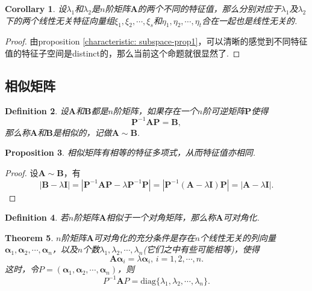 \documentclass{article}
\newtheorem{theorem}{Theorem}[section]
\newtheorem{corollary}[theorem]{Corollary}
\newtheorem{proposition}[theorem]{Proposition}
\newtheorem{definition}[theorem]{Definition}
\newcommand{\mbf}[1]{\bm{#1}}
\begin{document}
\begin{corollary}\label{characteristic: subspace-prop2}
\rm 设$\lambda_1$和$\lambda_2$是$n$阶矩阵$\mbf{A}$的两个不同的特征值，那么分别对应于$\lambda_1$及$\lambda_2$下的两个线性无关特征向量组$\xi_1,\xi_2,\cdots,\xi_s$和$\eta_1,\eta_2,\cdots,\eta_t$合在一起也是线性无关的.
\end{corollary}

\begin{proof}
由proposition \ref{characteristic: subspace-prop1}，可以清晰的感觉到不同特征值的特征子空间是distinct的，那么当前这个命题就很显然了. 
\end{proof}

\newpage
\subsection{相似矩阵}

\begin{definition}
\rm 设$\mbf{A}$和$\mbf{B}$都是$n$阶矩阵，如果存在一个$n$阶可逆矩阵$\mbf{P}$使得
$$
\mbf{P}^{-1}\mbf{A}\mbf{P} = \mbf{B},
$$
那么称$\mbf{A}$和$\mbf{B}$是相似的，记做$\mbf{A} \sim \mbf{B}$.
\end{definition}

\begin{proposition}
\rm 相似矩阵有相等的特征多项式，从而特征值亦相同. 
\end{proposition}

\begin{proof}
设$\mbf{A} \sim \mbf{B}$，有
$$
|\mbf{B} - \lambda\mbf{I}| = |\mbf{P}^{-1}\mbf{A}\mbf{P} -\lambda\mbf{P}^{-1}\mbf{P}| = |\mbf{P}^{-1}(\mbf{A}-\lambda\mbf{I})\mbf{P}| =|\mbf{A}-\lambda\mbf{I}|.
$$
\end{proof}

\begin{definition}
\rm 若$n$阶矩阵$\mbf{A}$相似于一个对角矩阵，那么称$\mbf{A}$可对角化. 
\end{definition}

\begin{theorem}
\rm $n$阶矩阵$\mbf{A}$可对角化的充分条件是存在$n$个线性无关的列向量$\mbf{\alpha}_1,\mbf{\alpha}_2,\cdots,\mbf{\alpha}_n$，以及$n$个数$\lambda_1,\lambda_2,\cdots,\lambda_n$(它们之中有些可能相等)，使得
$$
\mbf{A}\mbf{\alpha}_i = \lambda\mbf{\alpha}_i,\, i = 1,2,\cdots,n.
$$
这时，令$P = (\mbf{\alpha}_1,\mbf{\alpha}_2,\cdots,\mbf{\alpha}_n)$，则
$$
P^{-1}\mbf{A}P = \text{diag}\{\lambda_1,\lambda_2,\cdots,\lambda_n\}.
$$
\end{theorem}
\end{document}
